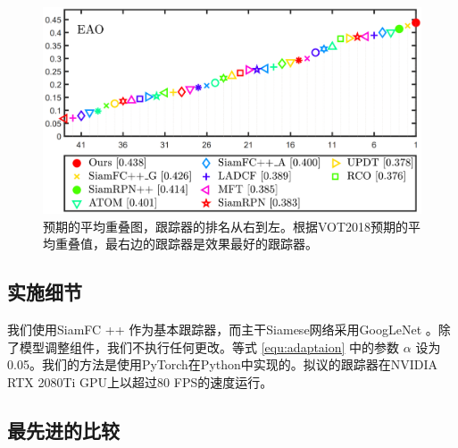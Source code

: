 \begin{figure}[t]
    \centering
    \includegraphics[width=1.0\textwidth]{Img/MTP/vot18/vot18_eao.png}
    \caption{预期的平均重叠图，跟踪器的排名从右到左。根据VOT2018预期的平均重叠值，最右边的跟踪器是效果最好的跟踪器。}
    \label{fig:eao}
\end{figure}

\subsection{实施细节}
我们使用SiamFC ++ \cite{SiamFC++}作为基本跟踪器，而主干Siamese网络采用GoogLeNet \cite{GoogLeNet}。除了模型调整组件，我们不执行任何更改。等式 \ref{equ:adaptaion} 中的参数 $\alpha$ 设为 0.05。我们的方法是使用PyTorch在Python中实现的。拟议的跟踪器在NVIDIA RTX 2080Ti GPU上以超过80 FPS的速度运行。

\subsection{最先进的比较}

